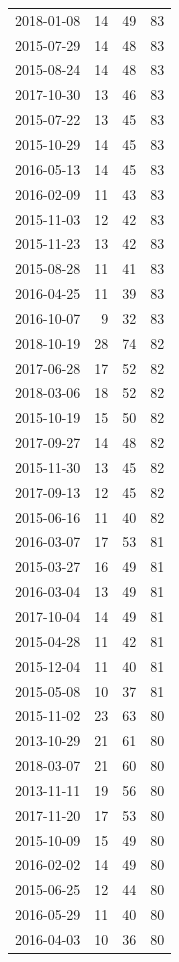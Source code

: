 \begin{tabular}{lrrr}
2018-01-08 & 14 & 49 & 83 \\
2015-07-29 & 14 & 48 & 83 \\
2015-08-24 & 14 & 48 & 83 \\
2017-10-30 & 13 & 46 & 83 \\
2015-07-22 & 13 & 45 & 83 \\
2015-10-29 & 14 & 45 & 83 \\
2016-05-13 & 14 & 45 & 83 \\
2016-02-09 & 11 & 43 & 83 \\
2015-11-03 & 12 & 42 & 83 \\
2015-11-23 & 13 & 42 & 83 \\
2015-08-28 & 11 & 41 & 83 \\
2016-04-25 & 11 & 39 & 83 \\
2016-10-07 & 9 & 32 & 83 \\
2018-10-19 & 28 & 74 & 82 \\
2017-06-28 & 17 & 52 & 82 \\
2018-03-06 & 18 & 52 & 82 \\
2015-10-19 & 15 & 50 & 82 \\
2017-09-27 & 14 & 48 & 82 \\
2015-11-30 & 13 & 45 & 82 \\
2017-09-13 & 12 & 45 & 82 \\
2015-06-16 & 11 & 40 & 82 \\
2016-03-07 & 17 & 53 & 81 \\
2015-03-27 & 16 & 49 & 81 \\
2016-03-04 & 13 & 49 & 81 \\
2017-10-04 & 14 & 49 & 81 \\
2015-04-28 & 11 & 42 & 81 \\
2015-12-04 & 11 & 40 & 81 \\
2015-05-08 & 10 & 37 & 81 \\
2015-11-02 & 23 & 63 & 80 \\
2013-10-29 & 21 & 61 & 80 \\
2018-03-07 & 21 & 60 & 80 \\
2013-11-11 & 19 & 56 & 80 \\
2017-11-20 & 17 & 53 & 80 \\
2015-10-09 & 15 & 49 & 80 \\
2016-02-02 & 14 & 49 & 80 \\
2015-06-25 & 12 & 44 & 80 \\
2016-05-29 & 11 & 40 & 80 \\
2016-04-03 & 10 & 36 & 80 \\

\end{tabular}
